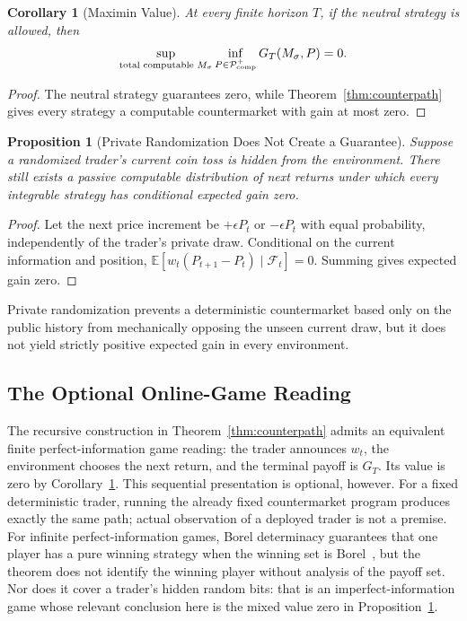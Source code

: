 \documentclass[aps,pra,reprint,superscriptaddress,amsmath,amssymb,floatfix]{revtex4-2}
\theoremstyle{plain}
\newtheorem{corollary}[theorem]{Corollary}
\newtheorem{proposition}[theorem]{Proposition}
\theoremstyle{definition}
\theoremstyle{remark}
\begin{document}
\begin{corollary}[Maximin Value]
  \label{cor:maximin}
  At every finite horizon \(T\), if the neutral strategy is allowed, then
  \[
    \sup_{\text{\rm total computable }M_\sigma}
    \inf_{P\in\mathcal P_{\mathrm{comp}}^{+}}
    G_T(M_\sigma,P)=0.
  \]
\end{corollary}

\begin{proof}
The neutral strategy guarantees zero, while
Theorem~\ref{thm:counterpath} gives every strategy a computable countermarket
with gain at most zero.
\end{proof}

\begin{proposition}[Private Randomization Does Not Create a Guarantee]
  \label{prop:randomized}
  Suppose a randomized trader's current coin toss is hidden from the
  environment. There still exists a passive computable distribution of next
  returns under which every integrable strategy has conditional expected gain
  zero.
\end{proposition}

\begin{proof}
Let the next price increment be \(+\epsilon P_t\) or \(-\epsilon P_t\) with
equal probability, independently of the trader's private draw. Conditional on
the current information and position,
\(\mathbb{E}[w_t(P_{t+1}-P_t)\mid\mathcal{F}_t]=0\).
Summing gives expected gain zero.
\end{proof}

Private randomization prevents a deterministic countermarket based only on the
public history from mechanically opposing the unseen current draw, but it does
not yield strictly positive expected gain in every environment.

\subsection{The Optional Online-Game Reading}

The recursive construction in Theorem~\ref{thm:counterpath} admits an
equivalent finite perfect-information game reading: the trader announces
\(w_t\), the environment chooses the next return, and the terminal payoff is
\(G_T\). Its value is zero by Corollary~\ref{cor:maximin}. This sequential
presentation is optional, however. For a fixed deterministic trader, running
the already fixed countermarket program produces exactly the same path; actual
observation of a deployed trader is not a premise. For infinite
perfect-information games, Borel determinacy guarantees that one player has a
pure winning strategy when the winning set is Borel~\cite{Martin1975}, but the
theorem does not identify the winning player without analysis of the payoff
set. Nor does it cover a trader's hidden random bits: that is an
imperfect-information game whose relevant conclusion here is the mixed value
zero in Proposition~\ref{prop:randomized}.
\end{document}
